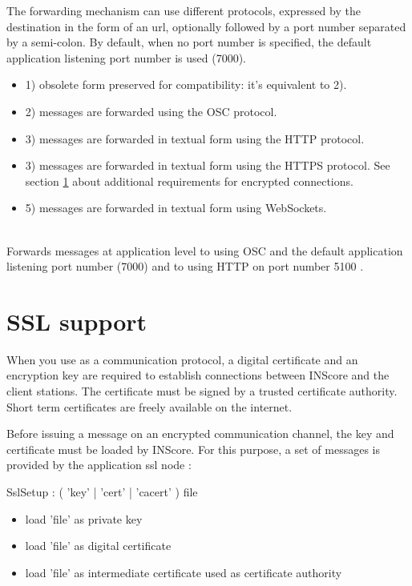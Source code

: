 \documentclass[a4paper,twoside]{report}
\newcommand{\sublevel}[1]	{\section{#1}}
\begin{document}
The forwarding mechanism can use different protocols, expressed by the destination in the form of an url, optionally followed by a port number separated by a semi-colon. By default, when no port number is specified, the default application listening port number is used (7000).

\begin{itemize}
\item 1) obsolete form preserved for compatibility: it's equivalent to 2). 
\item 2) messages are forwarded using the OSC protocol.
\item 3) messages are forwarded in textual form using the HTTP protocol.
\item 3) messages are forwarded in textual form using the HTTPS protocol. See section \ref{SSL} about additional requirements for encrypted connections.
\item 5) messages are forwarded in textual form using WebSockets.
\end{itemize}

\example\\
Forwards messages at application level to  using OSC and the default application listening port number (7000)
and to  using HTTP on port number 5100 .

\sublevel{SSL support}
\label{SSL}

When you use  as a communication protocol, a digital certificate and an encryption key are required to establish connections between INScore and the client stations. The certificate must be signed by a trusted certificate authority. Short term certificates are freely available on the internet. 

Before issuing a  message on an encrypted communication channel, the key and certificate must be loaded by INScore. For this purpose, a set of messages is provided by the application ssl node  :


\begin{rail}
SslSetup : ( 'key' | 'cert' | 'cacert' ) file
\end{rail}

\begin{itemize}
\item {} load 'file' as private key 
\item {} load 'file' as digital certificate
\item {} load 'file' as intermediate certificate used as certificate authority 
\end{itemize}
\end{document}
